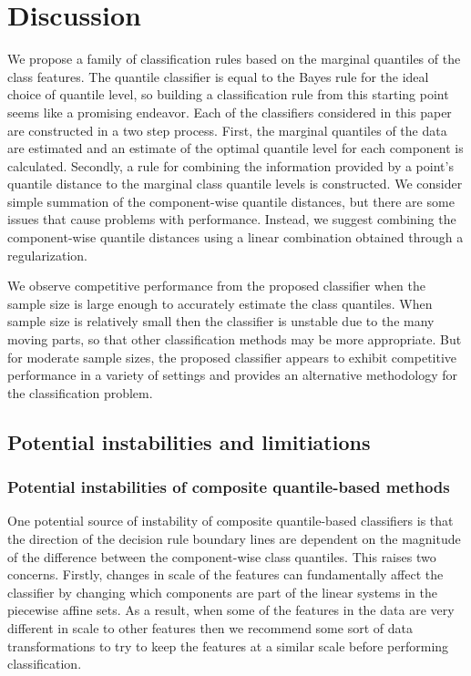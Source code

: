 
\section{Discussion}
\label{sec:discussion}

We propose a family of classification rules based on the marginal quantiles of
the class features.  The quantile classifier is equal to the Bayes rule for the
ideal choice of quantile level, so building a classification rule from this
starting point seems like a promising endeavor.  Each of the classifiers
considered in this paper are constructed in a two step process.  First, the
marginal quantiles of the data are estimated and an estimate of the optimal
quantile level for each component is calculated.  Secondly, a rule for combining
the information provided by a point's quantile distance to the marginal class
quantile levels is constructed.  We consider simple summation of the
component-wise quantile distances, but there are some issues that cause problems
with performance.  Instead, we suggest combining the component-wise quantile
distances using a linear combination obtained through a regularization.

We observe competitive performance from the proposed classifier when the sample
size is large enough to accurately estimate the class quantiles.  When sample
size is relatively small then the classifier is unstable due to the many moving
parts, so that other classification methods may be more appropriate.  But for
moderate sample sizes, the proposed classifier appears to exhibit competitive
performance in a variety of settings and provides an alternative methodology for
the classification problem.




\subsection{Potential instabilities and limitiations}
\label{sec:instabilities-and-limitations}

\subsubsection{Potential instabilities of composite quantile-based methods}
\label{sec:instabilities}

One potential source of instability of composite quantile-based classifiers is
that the direction of the decision rule boundary lines are dependent on the
magnitude of the difference between the component-wise class quantiles.  This
raises two concerns.  Firstly, changes in scale of the features can
fundamentally affect the classifier by changing which components are part of the
linear systems in the piecewise affine sets.  As a result, when some of the
features in the data are very different in scale to other features then we
recommend some sort of data transformations to try to keep the features at a
similar scale before performing classification.

